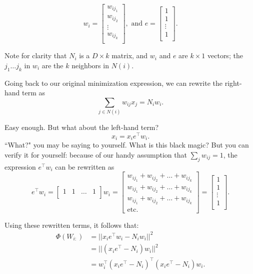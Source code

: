 \[w_i=
\begin{bmatrix}
    w_{ij_1} \\
    w_{ij_2} \\
    \vdots \\
    w_{ij_k} \\
\end{bmatrix}, \text{ and }
e=
\begin{bmatrix}
    1 \\
    1 \\
    \vdots \\
    1 \\
\end{bmatrix}.
\]

Note for clarity that $N_i$ is a $D \times k$ matrix, and $w_i$ and $e$ are $k \times 1$ vectors; the $j_1 \dots j_k$ in $w_i$ are the $k$ neighbors in $N(i)$.

Going back to our original minimization expression, we can rewrite the right-hand term as
\[
\sum_{j\in N(i)} w_{ij} x_j=N_i w_i.
\]

Easy enough. But what about the left-hand term?
\[
x_i = x_i e^{\intercal} w_i.
\]
``What?" you may be saying to yourself. What is this black magic? But you can verify it for yourself: because of our handy assumption that $\sum_j w_{ij} = 1$, the expression $e^\intercal w_i$ can be rewritten as
\[
e^\intercal w_i = \begin{bmatrix}
    1 & 1 & \dots & 1 \\
\end{bmatrix} w_i =
\begin{bmatrix}
    w_{ij_1} + w_{ij_2} + \dots + w_{ij_k} \\
    w_{ij_1} + w_{ij_2} + \dots + w_{ij_k} \\
    w_{ij_1} + w_{ij_2} + \dots + w_{ij_k} \\
    \text{etc.}
\end{bmatrix} =
\begin{bmatrix}
    1 \\
    1 \\
    \vdots \\
    1 \\
\end{bmatrix}.
\]

Using these rewritten terms, it follows that:
\begin{align*}
\Phi (W_{i:})
&= ||x_i e^\intercal w_i - N_i w_i||^2\\
&= ||(x_i e^\intercal-N_i)w_i||^2\\
&= w_i^\intercal (x_i e^\intercal-N_i)^\intercal (x_i e^\intercal - N_i) w_i.
\end{align*}

